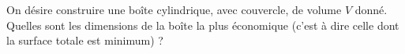 \begin{exercice}\label{exo3}

On désire construire une boîte cylindrique, avec couvercle, de volume $V$ donné. Quelles sont les dimensions de la boîte la plus économique (c'est à dire celle dont la surface totale est minimum) ?

\end{exercice}
